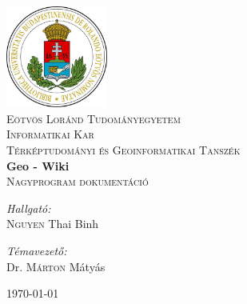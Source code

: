 \documentclass[final]{book}
\begin{document}
	\begin{titlepage}

	\begin{center}


	\includegraphics[width=0.25\textwidth]{./logo}\\[1cm]

	\textsc{ Eötvös Loránd Tudományegyetem \\
	Informatikai Kar
	\\
	Térképtudományi és Geoinformatikai Tanszék
	}\\[2.5cm]
	

	
	{ \huge \bfseries Geo - Wiki}\\[0.4cm]
	
	\textsc{Nagyprogram dokumentáció}\\[2.5cm]
	
	\begin{minipage}{0.4\textwidth}
	\begin{flushleft}
	\emph{Hallgató:}\\
	\textsc{Nguyen} Thai Binh
	\end{flushleft}
	\end{minipage}
	\begin{minipage}{0.4\textwidth}
	\begin{flushright}
	\emph{Témavezető:} \\
	Dr. \textsc{Márton} Mátyás
	\end{flushright}
	\end{minipage}

	\vfill

	{\large \today}

	\end{center}

	\end{titlepage}
	

	\tableofcontents
	
	

	
	
	
	
	
	
	
\end{document}
